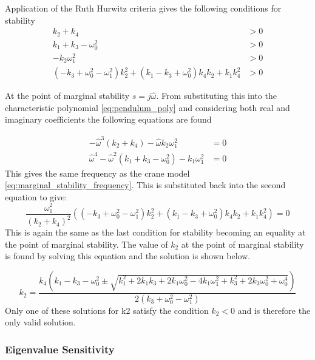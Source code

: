 \documentclass{article}
\begin{document}
Application of the Ruth Hurwitz criteria gives the following conditions for stability
\begin{align}
  k_{2} + k_{4} &> 0 \\
  k_{1} + k_{3} - \omega_{0}^{2} &> 0 \\
  - k_{2} \omega_{1}^{2} &> 0 \\
  \left(- k_{3} + \omega_{0}^{2} - \omega_{1}^{2}\right) k_{2}^{2} + \left(k_{1} - k_{3} + \omega_{0}^{2}\right) k_{4} k_{2} + k_{1} k_{4}^{2} &> 0
\end{align}

At the point of marginal stability $s = j\hat{\omega}$.
From substituting this into the characteristic polynomial \ref{eq:pendulum_poly} and considering both real and imaginary coefficients the following equations are found

\begin{align}
  - \hat{\omega}^{3} \left(k_{2} + k_{4}\right) - \hat{\omega} k_{2} \omega_{1}^{2} &= 0\\
  \hat{\omega}^{4} - \hat{\omega}^{2} \left(k_{1} + k_{3} - \omega_{0}^{2}\right) - k_{1} \omega_{1}^{2} &= 0
\end{align}
This gives the same frequency as the crane model \ref{eq:marginal_stability_frequency}. This is substituted back into the second equation to give:
\begin{equation}
  \frac{\omega_1^2}{(k_2 + k_4)^2} \left( \left(- k_{3} + \omega_{0}^{2} - \omega_{1}^{2}\right) k_{2}^{2} + \left(k_{1} - k_{3} + \omega_{0}^{2}\right) k_{4} k_{2} + k_{1} k_{4}^{2} \right) = 0
\end{equation}
This is again the same as the last condition for stability becoming an equality at the point of marginal stability.
The value of $k_2$ at the point of marginal stability is found by solving this equation and the solution is shown below.

\begin{equation}
  k_2 = \frac{k_{4} \left(k_{1} - k_{3} - \omega_{0}^{2} \pm \sqrt{k_{1}^{2} + 2 k_{1} k_{3} + 2 k_{1} \omega_{0}^{2} - 4 k_{1} \omega_{1}^{2} + k_{3}^{2} + 2 k_{3} \omega_{0}^{2} + \omega_{0}^{4}}\right)}{2 \left(k_{3} + \omega_{0}^{2} - \omega_{1}^{2}\right)}
\end{equation}
Only one of these solutions for k2 satisfy the condition $k_2 < 0$ and is therefore the only valid solution.


\subsubsection{Eigenvalue Sensitivity}
\end{document}
